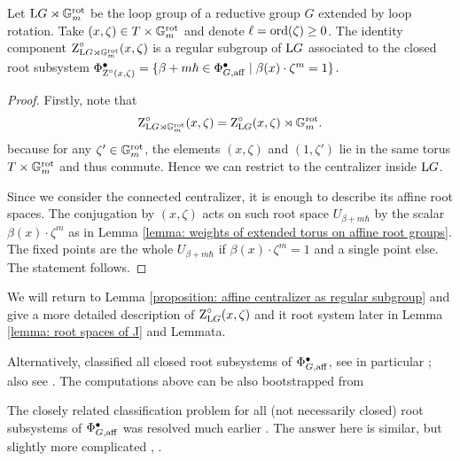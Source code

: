 \begin{lemma}\label{proposition: affine centralizer as regular subgroup}
Let $\mathrm{L} G \rtimes \mathbb{G}_m^{\mathrm{rot}}$ be the loop group of a reductive group $G$ extended by loop rotation. Take $(x, \zeta) \in T \times \mathbb{G}_m^{\mathrm{rot}}$ and denote $\ell =\mathrm{ord}(\zeta) \geq 0$. 
The identity component $\operatorname{Z}^{\circ}_{\mathrm{L} G \rtimes \mathbb{G}_m^{\mathrm{rot}}}(x, \zeta)$ is a regular subgroup of $\mathrm{L} G$ associated to the closed root subsystem $\Phi^{\bullet}_{\operatorname{Z}^{\circ}(x, \zeta)} = \{ \beta + m\hbar \in \Phi^{\bullet}_{G, \mathrm{aff}} \mid \beta(x) \cdot \zeta^m = 1 \}$.
\end{lemma}
\begin{proof}
Firstly, note that 
\begin{equation*}
    \operatorname{Z}^{\circ}_{\mathrm{L} G \rtimes \mathbb{G}_m^{\mathrm{rot}}}(x, \zeta) = \operatorname{Z}^{\circ}_{\mathrm{L} G}(x, \zeta) \rtimes \mathbb{G}_m^{\mathrm{rot}}.
\end{equation*}
because for any $\zeta' \in \mathbb{G}_m^{\mathrm{rot}}$, the elements $(x, \zeta)$ and $(1, \zeta')$ lie in the same torus $T \times \mathbb{G}_m^{\mathrm{rot}}$ and thus commute. Hence we can restrict to the centralizer inside $\mathrm{L} G$. 

Since we consider the connected centralizer, it is enough to describe its affine root spaces.
The conjugation by $(x, \zeta)$ acts on such root space $U_{\beta + m\hbar}$ by the scalar $\beta(x) \cdot \zeta^m$ as in Lemma \ref{lemma: weights of extended torus on affine root groups}.
The fixed points are the whole $U_{\beta + m\hbar}$ if $\beta(x) \cdot \zeta^m =1$ and a single point else. The statement follows.   
\end{proof}
%
We will return to Lemma \ref{proposition: affine centralizer as regular subgroup} and give a more detailed description of $\operatorname{Z}^{\circ}_{\mathrm{L} G}(x, \zeta)$ and it root system later in Lemma \ref{lemma: root spaces of J} and Lemmata.

\begin{remark}
Alternatively, \cite{RV19} classified all closed root subsystems of $\Phi^{\bullet}_{G, \mathrm{aff}}$, see in particular \cite[Proposition 4.1.1 and Theorem 4.2.1]{RV19}; also see \cite[Theorem 5.3]{FRT08}.
The computations above can be also bootstrapped from \cite[Proposition 3.2.1 with notation of \S 3.1]{RV19} 
\end{remark}


\begin{remark}
The closely related classification problem for all (not necessarily closed) root subsystems of $\Phi^{\bullet}_{G, \mathrm{aff}}$ was resolved much earlier \cite{Dye90, DL11a, DL11b}. The answer here is similar, but slightly more complicated \cite[Theorem 5.1 and \S 5.5]{Dye90}, \cite[Theorem 3]{DL11a}.
\end{remark}




